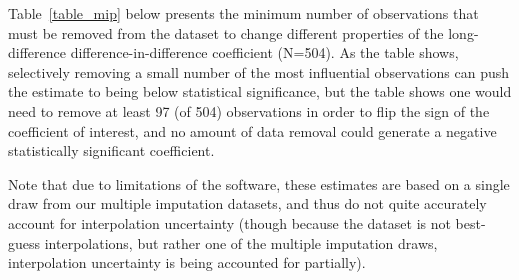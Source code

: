 \documentclass[12pt]{article}
\begin{document}
Table~\ref{table_mip} below presents the minimum number of observations that must be removed from the dataset to change different properties of the long-difference difference-in-difference coefficient (N=504). As the table shows, selectively removing a small number of the most influential observations can push the estimate to being below statistical significance, but the table shows one would need to remove at least 97 (of 504) observations in order to flip the sign of the coefficient of interest, and no amount of data removal could generate a negative statistically significant coefficient.

Note that due to limitations of the  software, these estimates are based on a single draw from our multiple imputation datasets, and thus do not quite accurately account for interpolation uncertainty (though because the dataset is not best-guess interpolations, but rather one of the multiple imputation draws, interpolation uncertainty is being accounted for partially).







\singlespacing \small
{}




\end{document}
